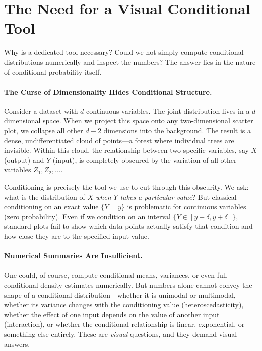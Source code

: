 \section{The Need for a Visual Conditional Tool}

Why is a dedicated tool necessary? Could we not simply compute conditional distributions numerically and inspect the numbers? The answer lies in the nature of conditional probability itself.

\paragraph{The Curse of Dimensionality Hides Conditional Structure.}
Consider a dataset with \(d\) continuous variables. The joint distribution lives in a \(d\)-dimensional space. When we project this space onto any two-dimensional scatter plot, we collapse all other \(d-2\) dimensions into the background. The result is a dense, undifferentiated cloud of points—a forest where individual trees are invisible. Within this cloud, the relationship between two specific variables, say \(X\) (output) and \(Y\) (input), is completely obscured by the variation of all other variables \(Z_1, Z_2, \dots\).

Conditioning is precisely the tool we use to cut through this obscurity. We ask: what is the distribution of \(X\) \emph{when \(Y\) takes a particular value}? But classical conditioning on an exact value \(\{Y = y\}\) is problematic for continuous variables (zero probability). Even if we condition on an interval \(\{Y \in [y-\delta, y+\delta]\}\), standard plots fail to show which data points actually satisfy that condition and how close they are to the specified input value.

\paragraph{Numerical Summaries Are Insufficient.}
One could, of course, compute conditional means, variances, or even full conditional density estimates numerically. But numbers alone cannot convey the shape of a conditional distribution—whether it is unimodal or multimodal, whether its variance changes with the conditioning value (heteroscedasticity), whether the effect of one input depends on the value of another input (interaction), or whether the conditional relationship is linear, exponential, or something else entirely. These are \emph{visual} questions, and they demand visual answers.

